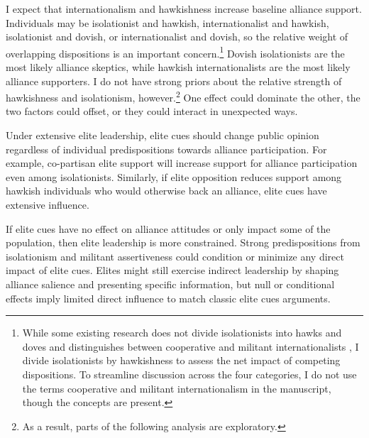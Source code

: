 \documentclass[12pt]{article}
\begin{document}
I expect that internationalism and hawkishness increase baseline alliance support.
Individuals may be isolationist and hawkish, internationalist and hawkish, isolationist and dovish, or internationalist and dovish, so the relative weight of overlapping dispositions is an important concern.\footnote{While some existing research does not divide isolationists into hawks and doves and distinguishes between cooperative and militant internationalists \citep{Kertzeretal2014}, I divide isolationists by hawkishness to assess the net impact of competing dispositions. To streamline discussion across the four categories, I do not use the terms cooperative and militant internationalism in the manuscript, though the concepts are present.}
Dovish isolationists are the most likely alliance skeptics, while hawkish internationalists are the most likely alliance supporters. 
I do not have strong priors about the relative strength of hawkishness and isolationism, however.\footnote{As a result, parts of the following analysis are exploratory.}
One effect could dominate the other, the two factors could offset, or they could interact in unexpected ways.




Under extensive elite leadership, elite cues should change public opinion regardless of individual predispositions towards alliance participation. 
For example, co-partisan elite support will increase support for alliance participation even among isolationists. 
Similarly, if elite opposition reduces support among hawkish individuals who would otherwise back an alliance, elite cues have extensive influence. 


If elite cues have no effect on alliance attitudes or only impact some of the population, then elite leadership is more constrained.
Strong predispositions from isolationism and militant assertiveness could condition or minimize any direct impact of elite cues.
Elites might still exercise indirect leadership by shaping alliance salience and presenting specific information, but null or conditional effects imply limited direct influence to match classic elite cues arguments. 
\end{document}
